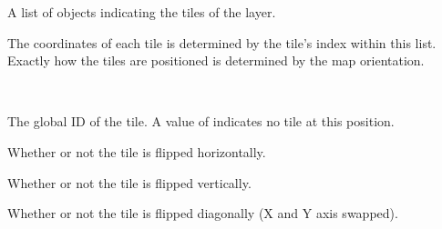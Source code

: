 \documentclass[letterpaper,10pt,english]{sphinxmanual}
\begin{document}
\begin{fulllineitems}
\begin{fulllineitems}
\end{fulllineitems}


\begin{fulllineitems}
\label{index:tmx.Layer.tiles}
A list of {\hyperref[index:tmx.LayerTile]{\emph{}}} objects indicating the tiles of the
layer.

The coordinates of each tile is determined by the tile's index
within this list.  Exactly how the tiles are positioned is
determined by the map orientation.

\end{fulllineitems}


\end{fulllineitems}


\begin{fulllineitems}
\label{index:tmx.LayerTile}~

\begin{fulllineitems}
\label{index:tmx.LayerTile.gid}
The global ID of the tile.  A value of  indicates no tile at
this position.

\end{fulllineitems}


\begin{fulllineitems}
\label{index:tmx.LayerTile.hflip}
Whether or not the tile is flipped horizontally.

\end{fulllineitems}


\begin{fulllineitems}
\label{index:tmx.LayerTile.vflip}
Whether or not the tile is flipped vertically.

\end{fulllineitems}


\begin{fulllineitems}
\label{index:tmx.LayerTile.dflip}
Whether or not the tile is flipped diagonally (X and Y axis
swapped).

\end{fulllineitems}


\end{fulllineitems}
\end{document}
